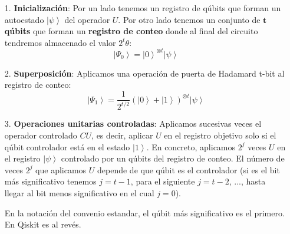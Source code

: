 \documentclass[a4paper,11pt]{book} %
\numberwithin{equation}{chapter}
\begin{document}
\begin{itemize}
	\item[1.] \textbf{Inicialización}: Por un lado tenemos un registro de qúbits que forman un autoestado $\left| \psi \right\rangle$ del operador $U$. Por otro lado tenemos un conjunto de $\bm t$ \textbf{qúbits} que forman un \textbf{registro de conteo} donde al final del circuito tendremos almacenado el valor $2^t \theta$:
\begin{equation}
\left| \Psi_0 \right\rangle = \left| 0 \right\rangle^{\otimes t} \left| \psi \right\rangle
\end{equation}

	\item[2.] \textbf{Superposición}: Aplicamos una operación de puerta de Hadamard t-bit al registro de conteo:
\begin{equation}
\left| \Psi_1 \right\rangle = \frac{1}{2^{t/2}}  \left( \left| 0 \right\rangle + \left| 1 \right\rangle \right)^{\otimes t} \left| \psi \right\rangle
\end{equation}

	\item[3.] \textbf{Operaciones unitarias controladas}: Aplicamos sucesivas veces el operador controlado $CU$, es decir, aplicar $U$ en el registro objetivo solo si el qúbit controlador está en el estado $\left| 1 \right\rangle$. En concreto, aplicamos $2^{j}$ veces $U$ en el registro $\left| \psi \right\rangle$ controlado por un qúbits del registro de conteo. El número de veces $2^{j}$ que aplicamos $U$ depende de que qúbit es el controlador (si es el bit más significativo tenemos $j = t-1$, para el siguiente $j = t-2$, ..., hasta llegar al bit menos significativo en el cual $j=0$). 
	
	En la notación del convenio estandar, el qúbit más significativo es el primero. En Qiskit es al revés.


\end{itemize}
\end{document}
